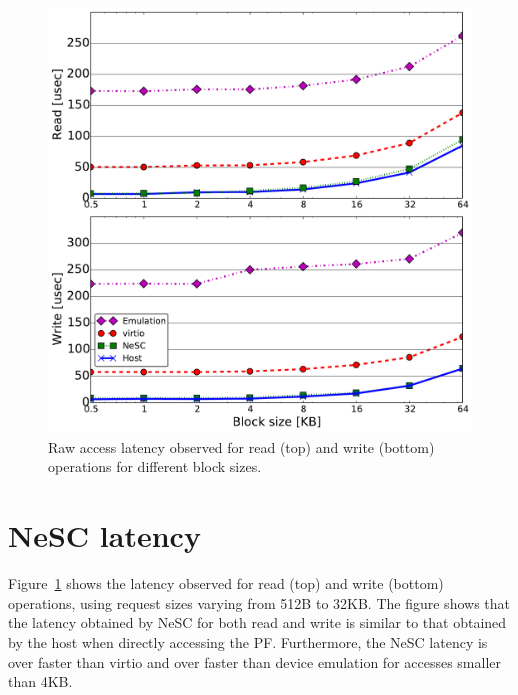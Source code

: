 \begin{figure}[t]
  \centering
  \includegraphics[width=1\columnwidth]{figs/latency_block_size.pdf}
  \caption{Raw access latency observed for read (top) and write (bottom) operations for different block sizes.}
  \label{fig:latency}
\end{figure}

\section*{NeSC latency}
Figure~\ref{fig:latency} shows the latency observed for read (top) and write (bottom) operations, using request sizes varying from 512B to 32KB. The figure shows that the latency obtained by NeSC for both read and write is similar to that obtained by the host when directly accessing the PF. Furthermore, the NeSC latency is  over  faster than virtio and over  faster than device emulation for accesses smaller than 4KB.

